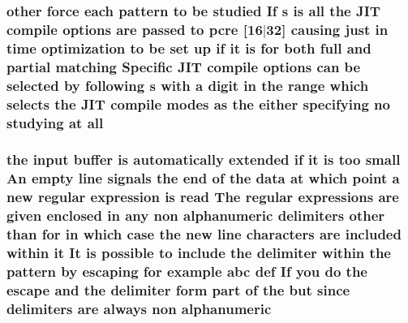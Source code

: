 \subsubsection[{\texorpdfstring{all}{all}}]{ other force each {\bf pattern} {\bf to} {\bf be} {\bf studied} If {\bf s} {\bf is} all the J\+IT {\bf compile} {\bf options} {\bf are} passed {\bf to} {\bf pcre} \mbox{[}16$\vert$32\mbox{]} causing just {\bf in} {\bf time} optimization {\bf to} {\bf be} {\bf set} up {\bf if} {\bf it} {\bf is} for both full and {\bf partial} {\bf matching} Specific J\+IT {\bf compile} {\bf options} {\bf can} {\bf be} {\bf selected} by following {\bf s} {\bf with} {\bf a} digit {\bf in} the range {\bf which} selects the J\+IT {\bf compile} {\bf modes} {\bf as} the either {\bf specifying} no {\bf studying} at all}\hypertarget{pcretest_8txt_a0c81554ea08028a00dbedabe60072c53}{}\label{pcretest_8txt_a0c81554ea08028a00dbedabe60072c53}
\subsubsection[{\texorpdfstring{alphanumeric}{alphanumeric}}]{\setlength{\rightskip}{0pt plus 5cm}the {\bf input} {\bf buffer} {\bf is} automatically extended {\bf if} {\bf it} {\bf is} too small An {\bf empty} {\bf line} signals the {\bf end} {\bf of} the {\bf data} at {\bf which} {\bf point} {\bf a} new regular {\bf expression} {\bf is} {\bf read} The regular {\bf expressions} {\bf are} {\bf given} enclosed {\bf in} {\bf any} non alphanumeric delimiters other {\bf than} for {\bf in} {\bf which} {\bf case} the new {\bf line} {\bf characters} {\bf are} {\bf included} within {\bf it} It {\bf is} {\bf possible} {\bf to} {\bf include} the delimiter within the {\bf pattern} by escaping for {\bf example} {\bf abc} def If you {\bf do} the escape and the delimiter form part {\bf of} the but since delimiters {\bf are} always non alphanumeric}\hypertarget{pcretest_8txt_aceae0b17621b4d829b3c63d6c085706d}{}\label{pcretest_8txt_aceae0b17621b4d829b3c63d6c085706d}
